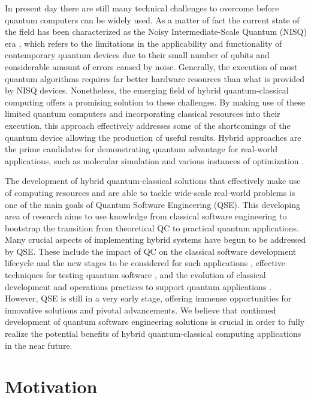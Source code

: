 In present day there are still many technical challenges to overcome before quantum computers can be widely used. As a matter of fact the current state of the field has been characterized as the Noisy Intermediate-Scale Quantum (NISQ) era \cite{preskill-2018-nisq}, which refers to the limitations in the applicability and functionality of contemporary quantum devices due to their small number of qubits and considerable amount of errors caused by noise. Generally, the execution of most quantum algorithms requires far better hardware resources than what is provided by NISQ devices. Nonetheless, the emerging field of hybrid quantum-classical computing offers a promising solution to these challenges. By making use of these limited quantum computers and incorporating classical resources into their execution, this approach effectively addresses some of the shortcomings of the quantum device allowing the production of useful results. Hybrid approaches are the prime candidates for demonstrating quantum advantage for real-world applications, such as molecular simulation \cite{peruzzo-2014-vqe} and various instances of optimization \cite{farhi-2014-qaoa}.

The development of hybrid quantum-classical solutions that effectively make use of computing resources and are able to tackle wide-scale real-world problems is one of the main goals of Quantum Software Engineering (QSE). This developing area of research aims to use knowledge from classical software engineering to bootstrap the transition from theoretical QC to practical quantum applications. Many crucial aspects of implementing hybrid systems have begun to be addressed by QSE. These include the impact of QC on the classical software development lifecycle and the new stages to be considered for such applications \cite{weder-2020-lifecycle}, effective techniques for testing quantum software \cite{garcia-2023-testing}, and the evolution of classical development and operations practices to support quantum applications \cite{gheorghe-pop-2020-devops}. However, QSE is still in a very early stage, offering immense opportunities for innovative solutions and pivotal advancements. We believe that continued development of quantum software engineering solutions is crucial in order to fully realize the potential benefits of hybrid quantum-classical computing applications in the near future.

\section{Motivation}
\label{sect:introduction--motivation}

